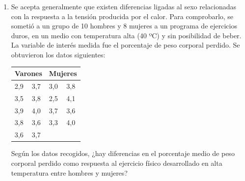 \begin{enumerate}[leftmargin=*]
\item Se acepta generalmente que existen diferencias ligadas al
sexo relacionadas con la respuesta a la tensión producida por el
calor. Para comprobarlo, se sometió a un grupo de 10 hombres y 8
mujeres a un programa de ejercicios duros, en un medio con
temperatura alta (40 ºC) y sin posibilidad de beber. La variable
de interés medida fue el porcentaje de peso corporal perdido. Se
obtuvieron los datos siguientes:

\begin{center}
\begin{tabular}{ll|ll}
\hline
\multicolumn{2}{c}{Varones} & \multicolumn{2}{c}{Mujeres} \\
\hline
2,9 & 3,7 & 3,0 & 3,8 \\
3,5 & 3,8 & 2,5 & 4,1 \\
3,9 & 4,0 & 3,7 & 3,6 \\
3,8 & 3,6 & 3,3 & 4,0 \\
3,6 & 3,7 &  &  \\
\hline
\end{tabular}
\end{center}
Según los datos recogidos, ¿hay diferencias en el porcentaje medio
de peso corporal perdido como respuesta al ejercicio físico
desarrollado en alta temperatura entre hombres y mujeres?
\end {enumerate}
